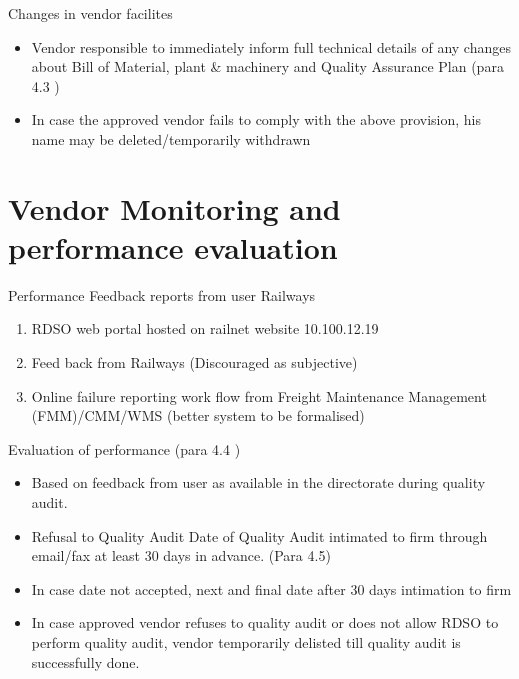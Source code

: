 \documentclass[
  10pt,
  ignorenonframetext,
  aspectratio=43,
]{beamer}
\providecommand{\tightlist}{%
  \setlength{\itemsep}{0pt}\setlength{\parskip}{0pt}}
\begin{document}
\begin{frame}{Changes in vendor facilites}
\protect\hypertarget{changes-in-vendor-facilites}{}
\begin{itemize}
\tightlist
\item
  Vendor responsible to immediately inform full technical details of any
  changes about Bill of Material, plant \& machinery and Quality
  Assurance Plan (para 4.3 )
\item
  In case the approved vendor fails to comply with the above provision,
  his name may be deleted/temporarily withdrawn
\end{itemize}
\end{frame}

\hypertarget{vendor-monitoring-and-performance-evaluation}{%
\section{Vendor Monitoring and performance
evaluation}\label{vendor-monitoring-and-performance-evaluation}}

\begin{frame}{Performance Feedback reports from user Railways}
\protect\hypertarget{performance-feedback-reports-from-user-railways}{}
\begin{enumerate}
\tightlist
\item
  RDSO web portal hosted on railnet website 10.100.12.19
\item
  Feed back from Railways (Discouraged as subjective)
\item
  Online failure reporting work flow from Freight Maintenance Management
  (FMM)/CMM/WMS (better system to be formalised)
\end{enumerate}
\end{frame}

\begin{frame}{Evaluation of performance (para 4.4 )}
\protect\hypertarget{evaluation-of-performance-para-4.4}{}
\begin{itemize}
\tightlist
\item
  Based on feedback from user as available in the directorate during
  quality audit.
\item
  Refusal to Quality Audit Date of Quality Audit intimated to firm
  through email/fax at least 30 days in advance. (Para 4.5)
\item
  In case date not accepted, next and final date after 30 days
  intimation to firm
\item
  In case approved vendor refuses to quality audit or does not allow
  RDSO to perform quality audit, vendor temporarily delisted till
  quality audit is successfully done.
\end{itemize}
\end{frame}
\end{document}

